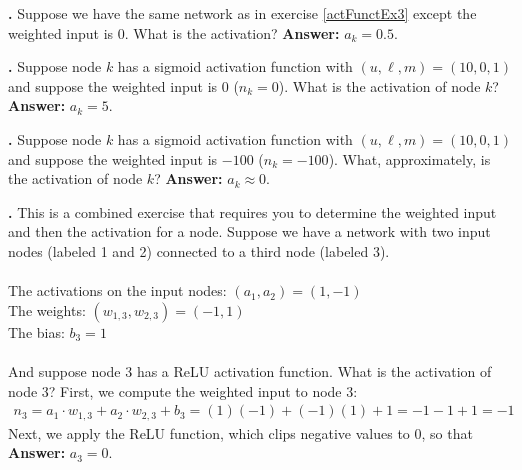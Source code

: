 \bigskip

\noindent
{\bf \theActFunctionCounter.} Suppose we have the same network as in exercise \ref{actFunctEx3} except the weighted input is $0$. What is the activation?  {\bf Answer:} $a_k = 0.5$. 

\bigskip


\noindent
{\bf \theActFunctionCounter.} Suppose node $k$ has a sigmoid activation function
with $(u,\ell,m) = (10,0,1)$ and suppose the weighted input is 
$0$ ($n_k = 0$). What is the activation of node $k$? {\bf Answer:} $a_k = 5$.

\bigskip


\noindent
{\bf \theActFunctionCounter.} Suppose node $k$ has a sigmoid activation function
with $(u,\ell,m) = (10,0,1)$ and suppose the weighted input is 
$-100$ ($n_k = -100$). What, approximately, is the activation of node $k$? {\bf Answer:} $a_k  \approx 0$.

\bigskip

\label{actFunctEx4}
\noindent
{\bf \theActFunctionCounter.} This is a combined exercise that requires you to determine 
the weighted input and then the activation for a node. Suppose we have a network with 
two input nodes (labeled 1 and 2) connected to a third node (labeled 3). \\ \\
\indent \qquad\qquad The activations on the input nodes: $(a_1,a_2) = (1,-1)$\\
\indent \qquad\qquad The weights: $(w_{1,3}, w_{2,3}) = (-1,1)$ \\
\indent \qquad\qquad The bias: $b_3 = 1$ \\ \\
And suppose node 3 has a ReLU activation function. What is the 
activation of node 3?  First, we compute the weighted input to node 3:
\begin{eqnarray*}
n_3 = a_1 \cdot w_{1,3}  + a_2 \cdot w_{2,3} + b_{3} 
    =     (1)(-1)        +     (-1)(1)       + 1     
    = -1 -1 + 1 = -1
\end{eqnarray*}
Next, we apply the ReLU function, which clips negative values to 0, so that
{\bf Answer:}  $a_3=0$.

\bigskip

